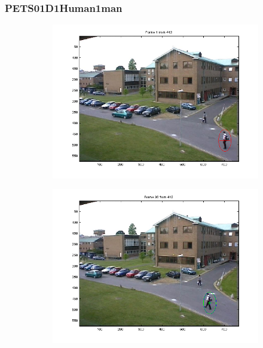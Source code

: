 \documentclass[hyperref={pdfpagelabels=false}]{beamer}
\begin{document}
\begin{frame}
\frametitle{PETS01D1Human1man}
\begin{figure}
         \centering
         \begin{subfigure}[b]{0.3\textwidth}
                 \includegraphics[width=\textwidth]{results/PETS01D1Human1man/Frame0001.png}
         \end{subfigure}%
         \begin{subfigure}[b]{0.3\textwidth}
                 \includegraphics[width=\textwidth]{results/PETS01D1Human1man/Frame0030.png}
         \end{subfigure}
         \begin{subfigure}[b]{0.3\textwidth}

\end{subfigure}
\end{figure}
\end{frame}
\end{document}

